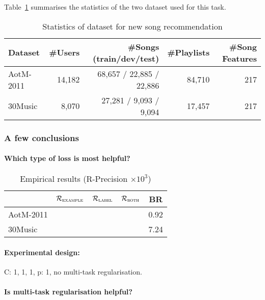 Table~\ref{tab:stats_newsongrec} summarises the statistics of the two dataset used for this task.

\begin{table}[!h]
\centering
\caption{Statistics of dataset for new song recommendation}
\label{tab:stats_newsongrec}
\small
\begin{tabular}{l|rrrr}
\toprule
Dataset & \#Users & \#Songs (train/dev/test) & \#Playlists & \#Song Features \\
\midrule
AotM-2011 & 14,182  & 68,657 / 22,885 / 22,886 & 84,710 & 217 \\
30Music   & 8,070   & 27,281 / 9,093 / 9,094   & 17,457 & 217 \\
\bottomrule
\end{tabular}
\end{table}


\subsubsection{A few conclusions}

\paragraph{Which type of loss is most helpful?}
\begin{table}[!h]
\centering
\caption{Empirical results (R-Precision $\times 10^3$)}
\small
\begin{tabular}{l|cccc}
\toprule
{}            & $\mathcal{R}_\textsc{example}$ & $\mathcal{R}_\textsc{label}$ & $\mathcal{R}_\textsc{both}$ & BR \\
\midrule
AotM-2011     &  &  &  & 0.92 \\
30Music       &  &  &  & 7.24 \\
\bottomrule
\end{tabular}
\end{table}

\paragraph{Experimental design:}
C: 1, 1, 1, p: 1, no multi-task regularisation.

\paragraph{Is multi-task regularisation helpful?}

